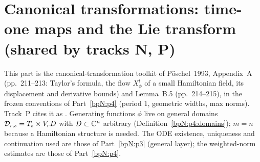 \section{Canonical transformations: time-one maps and the Lie transform (shared by tracks N, P)}\label{bpN:p5}
\begingroup\sloppy

This part is the canonical-transformation toolkit of P\"oschel~1993, Appendix~A (pp.~211--213: Taylor's formula, the flow $X_\phi^t$ of a small Hamiltonian field, its displacement and derivative bounds) and Lemma~B.5 (pp.~214--215), in the frozen conventions of
Part~\ref{bpN:p4} (period $1$, geometric widths, max norms). Track~P cites it as . Generating functions $\phi$ live on general domains $\mathcal D_{r,s}=T_s\times V_rD$ with $D\subset\mathbb{C}^n$ arbitrary (Definition~\ref{bpN:p4:domains}); $m=n$ because a Hamiltonian
structure is needed. The ODE existence, uniqueness and continuation used are those of Part~\ref{bpN:p3} (general layer); the weighted-norm estimates are those of Part~\ref{bpN:p4}.


